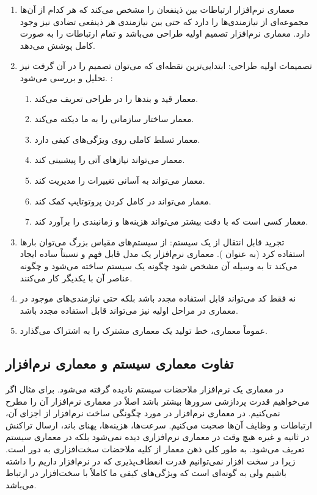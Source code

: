 \begin{enumerate}
    \item معماری نرم‌افزار ارتباطات بین ذینفعان را مشخص می‌کند که هر کدام از
    آن‌ها مجموعه‌ای از نیازمندی‌ها را دارد که حتی بین نیازمندی هر ذینفعی تضادی
    نیز وجود دارد. معماری نرم‌افزار تصمیم اولیه طراحی می‌باشد و تمام ارتباطات را
    به صورت کامل پوشش می‌دهد.
    \item تصمیمات اولیه طراحی: ابتدایی‌ترین نقطه‌ای که می‌توان تصمیم را در آن
    گرفت نیز تحلیل و بررسی می‌شود. :
    \begin{enumerate}
        \item معمار قید و بند‌ها را در طراحی تعریف می‌کند.
        \item معمار ساختار سازمانی را به ما دیکته می‌کند.
        \item معمار تسلط کاملی روی ویژگی‌های کیفی دارد.
        \item معمار می‌تواند نیاز‌های آتی را پیشبینی کند.
        \item معمار می‌تواند به آسانی تغییرات را مدیریت کند.
        \item معمار می‌تواند در کامل کردن پروتوتایپ کمک کند.
        \item معمار کسی است که با دقت بیشتر می‌تواند هزینه‌ها و زمانبندی را
        برآورد کند.
    \end{enumerate}
    \item تجرید قابل انتقال از یک سیستم: از سیستم‌های مقیاس بزرگ می‌توان بار‌ها
    استفاده کرد (به عنوان ). معماری نرم‌افزار یک مدل
    قابل فهم و نسبتاً ساده ایجاد می‌کند تا به وسیله آن مشخص شود چگونه یک سیستم
    ساخته می‌شود و چگونه عناصر آن با یکدیگر کار می‌کنند.
    \item نه فقط کد می‌تواند قابل استفاده مجدد باشد بلکه حتی نیازمندی‌های موجود
    در معماری در مراحل اولیه نیز می‌تواند قابل استفاده مجدد باشد.
    \item عموماً معماری، خط تولید یک معماری مشترک را به اشتراک می‌گذارد.
\end{enumerate}

\subsection{تفاوت معماری سیستم و معماری نرم‌افزار}

در معماری یک نرم‌افزار ملاحضات سیستم نادیده گرفته می‌شود. برای مثال اگر
می‌خواهیم قدرت پردازشی سرور‌ها بیشتر باشد اصلاً در معماری نرم‌افزار آن را مطرح
نمی‌کنیم. در معماری نرم‌افزار در مورد چگونگی ساخت نرم‌افزار از اجزای آن،
ارتباطات و وظایف آن‌ها صحبت می‌کنیم. سرعت‌ها، هزینه‌ها، پهنای باند، ارسال تراکنش
در ثانیه و غیره هیچ وقت در معماری نرم‌افزاری دیده نمی‌شود بلکه در معماری سیستم
تعریف می‌شود. به طور کلی ذهن معمار از کلیه ملاحضات سخت‌افزاری به دور است. زیرا
در سخت افزار نمی‌توانیم قدرت انعطاف‌پذیری که در نرم‌افزار داریم را داشته باشیم
ولی به گونه‌ای است که ویژگی‌های کیفی ما کاملاً با سخت‌افزار در ارتباط می‌باشد.

